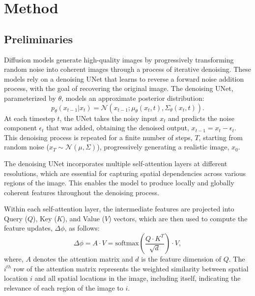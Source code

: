 \section{Method}

\subsection{Preliminaries}

Diffusion models \citep{ho2020ddpm} generate high-quality images by progressively transforming random noise into coherent images through a process of iterative denoising. 
These models rely on a denoising UNet that learns to reverse a forward noise addition process, with the goal of recovering the original image. 
The denoising UNet, parameterized by $\theta$, models an approximate posterior distribution:
\begin{equation}
    p_{\theta}(x_{t-1} | x_t ) =  \mathcal{N}\left ( x_{t-1}; \mu_\theta (x_t, t), \Sigma_\theta(x_t,t) \right ).
\end{equation}
At each timestep $t$, the UNet takes the noisy input $x_t$ and predicts the noise component $\epsilon_t$ that was added, obtaining the denoised output, $x_{t-1} = x_{t} - \epsilon_t$.
This denoising process is repeated for a finite number of steps, $T$, starting from random noise ($x_T \sim \mathcal{N}(\mu, \Sigma)$), progressively generating a realistic image, $x_0$. 

The denoising UNet incorporates multiple self-attention layers \citep{vaswani2017attention} at different resolutions, which are essential for capturing spatial dependencies across various regions of the image. 
This enables the model to produce locally and globally coherent features throughout the denoising process.

Within each self-attention layer, the intermediate features are projected into Query ($Q$), Key ($K$), and Value ($V$) vectors, which are then used to compute the feature updates, $\Delta\phi$, as follows:
\begin{equation}
    \Delta\phi = A \cdot V = \text{softmax}\left(\frac{Q\cdot K^T}{\sqrt{d}} \right ) \cdot V, \label{eq:feat_update_default}
\end{equation}
where, $A$ denotes the attention matrix and $d$ is the feature dimension of $Q$. 
The $i^{th}$ row of the attention matrix represents the weighted similarity between spatial location $i$ and all spatial locations in the image, including itself, indicating the relevance of each region of the image to $i$. 


